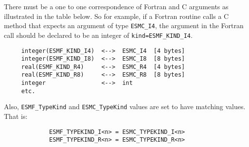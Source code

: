 There must be a one to one correspondence of Fortran and C arguments as illustrated in the table below. So for example, if a Fortran routine calls a C method that expects an argument of type {\tt ESMC\_I4}, the argument in the Fortran call should be declared to be an integer of {\tt kind=ESMF\_KIND\_I4}.
\begin{verbatim}
     integer(ESMF_KIND_I4)  <-->  ESMC_I4  [4 bytes]
     integer(ESMF_KIND_I8)  <-->  ESMC_I8  [8 bytes]
     real(ESMF_KIND_R4)     <-->  ESMC_R4  [4 bytes]
     real(ESMF_KIND_R8)     <-->  ESMC_R8  [8 bytes]
     integer                <-->  int
     etc.
\end{verbatim}
Also, {\tt ESMF\_TypeKind} and {\tt ESMC\_TypeKind} values are set to have matching values. That is:
\begin{verbatim}
             ESMF_TYPEKIND_I<n> = ESMC_TYPEKIND_I<n>
             ESMF_TYPEKIND_R<n> = ESMC_TYPEKIND_R<n>
\end{verbatim}

















